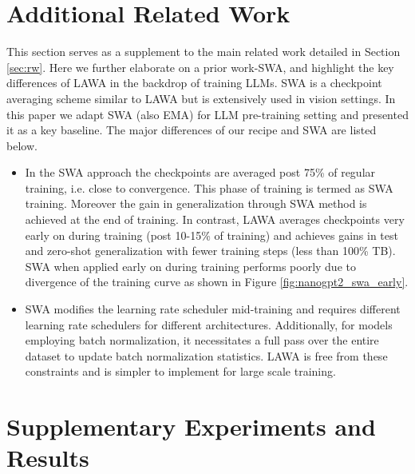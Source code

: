 \documentclass{article}
\newcommand{\method}{LAWA}
\begin{document}
\section{Additional Related Work} \label{sec:sup rw}

This section serves as a supplement to the main related work detailed in Section \ref{sec:rw}. Here we further elaborate on a prior work-SWA, and highlight the key differences of \method{} in the backdrop of training LLMs. SWA \cite{SWA} is a checkpoint averaging scheme similar to \method{} but is extensively used in vision settings. In this paper we adapt SWA (also EMA) for LLM pre-training setting and presented it as a key baseline. The major differences of our recipe and SWA are listed below.



\begin{itemize}
    \item In the SWA approach the checkpoints are averaged post 75\% of regular training, i.e. close to convergence. This phase of training is termed as SWA training. Moreover the gain in generalization through SWA method is achieved at the end of training. In contrast, \method{} averages checkpoints very early on during training (post 10-15\% of training) and achieves gains in test and zero-shot generalization with fewer training steps (less than 100\% TB). SWA when applied early on during training performs poorly due to divergence of the training curve as shown in Figure \ref{fig:nanogpt2_swa_early}. 

    \item SWA modifies the learning rate scheduler mid-training and requires different learning rate schedulers for different architectures. Additionally, for models employing batch normalization, it necessitates a full pass over the entire dataset to update batch normalization statistics. \method{} is free from these constraints and is simpler to implement for large scale training.

\end{itemize}

\section{Supplementary Experiments and Results} \label{sec:sup exps}
\end{document}
